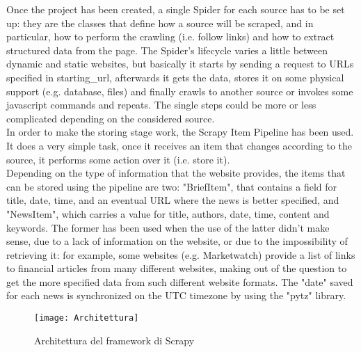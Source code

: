 Once the project has been created, a single Spider \cite{scrapyspider} for each source has to be set up: they are the classes that define how a source will be scraped, and in particular, how to perform the crawling (i.e. follow links) and how to extract structured data from the page. The Spider's lifecycle varies a little between dynamic and static websites, but basically it starts by sending a request to URLs specified in starting\_url, afterwards it gets the data, stores it on some physical support (e.g. database, files) and finally crawls to another source or invokes some javascript commands and repeats. The single steps could be more or less complicated depending on the considered source. \\
In order to make the storing stage work, the Scrapy Item Pipeline \cite{scrapypipeline} has been used. It does a very simple task, once it receives an item that changes according to the source, it performs some action over it (i.e. store it).\\
Depending on the type of information that the website provides, the items that can be stored using the pipeline are two: "BriefItem", that contains a field for title, date, time, and an eventual URL where the news is better specified, and "NewsItem", which carries a value for title, authors, date, time, content and keywords. The former has been used when the use of the latter didn't make sense, due to a lack of information on the website, or due to the impossibility of retrieving it: for example, some websites (e.g. Marketwatch) provide a list of links to financial articles from many different websites, making out of the question to get the more specified data from such different website formats. The "date" saved for each news is synchronized on the UTC timezone by using the "pytz" library.

\begin{figure}[H]
\centering
\texttt{[image: Architettura]}
\caption{Architettura del framework di Scrapy}\label{fig:1}
\end{figure}

